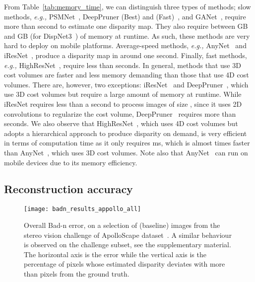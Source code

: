 \documentclass[10pt,journal,compsoc]{IEEEtran}
\newcommand{\eg}{\emph{e.g., }}
\begin{document}
From Table~\ref{tab:memory_time}, we can distinguish three types of methods; slow methods, \eg  PSMNet~\cite{chang2018pyramid}, DeepPruner (Best) and (Fast)~\cite{Duggal_2019_ICCV},   and GANet~\cite{zhang2019ga}, require  more than  second to estimate one  disparity map. They  also require between GB and GB (for DispNet3~\cite{Ilg_2018_ECCV}) of memory at runtime. As such, these methods are very hard to deploy on mobile platforms. Average-speed methods, \eg AnyNet~\cite{wang2019anytime} and iResNet~\cite{liang2018learning}, produce a disparity map  in around one second. Finally, fast methods, \eg HighResNet~\cite{Yang_2019_CVPR},  require less than  seconds. In general, methods that use 3D cost volumes are faster and less memory demanding than those that use 4D cost volumes. There are, however, two exceptions: iResNet~\cite{liang2018learning} and DeepPruner~\cite{Duggal_2019_ICCV}, which use 3D cost volumes but  require a large amount of memory at runtime.  While iResNet requires less than a second to process  images of size , since it uses 2D convolutions to regularize the cost volume, DeepPruner~\cite{Duggal_2019_ICCV} requires more than  seconds.  We also observe that HighResNet~\cite{Yang_2019_CVPR}, which uses 4D cost volumes but adopts a hierarchical approach to produce disparity on demand, is very efficient in terms of computation time as it only requires ms, which is almost  times faster than AnyNet~\cite{wang2019anytime}, which uses 3D cost volumes.  Note also that AnyNet~\cite{wang2019anytime} can run on mobile devices due to its memory efficiency.



\subsection{Reconstruction accuracy}
\label{sec:performance_stereo_error}

\begin{figure}[t]
\centering
	\texttt{[image: badn\_results\_appollo\_all]} 
\caption{\label{fig:badn_apolloscape} Overall Bad-n error,  on a selection of  (baseline)   images from the stereo vision challenge of ApolloScape dataset~\cite{wang2019apolloscape}.   A similar behaviour is observed on the challenge subset, see the supplementary material. The horizontal axis is the error  while the vertical axis is the percentage of pixels whose estimated disparity deviates with more than   pixels from the ground truth.  }
\end{figure}
 
\end{document}
